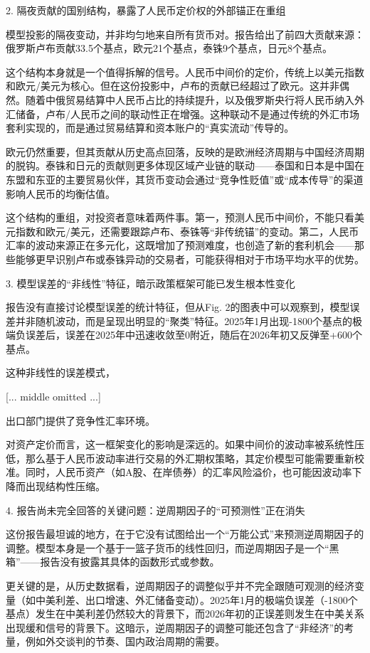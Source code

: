\documentclass[11pt]{ctexart}
\begin{document}
2. 隔夜贡献的国别结构，暴露了人民币定价权的外部锚正在重组

模型投影的隔夜变动，并非均匀地来自所有货币对。报告给出了前四大贡献来源：俄罗斯卢布贡献33.5个基点，欧元21个基点，泰铢9个基点，日元8个基点。

这个结构本身就是一个值得拆解的信号。人民币中间价的定价，传统上以美元指数和欧元/美元为核心。但在这份投影中，卢布的贡献已经超过了欧元。这并非偶然。随着中俄贸易结算中人民币占比的持续提升，以及俄罗斯央行将人民币纳入外汇储备，卢布/人民币之间的联动性正在增强。这种联动不是通过传统的外汇市场套利实现的，而是通过贸易结算和资本账户的“真实流动”传导的。

欧元仍然重要，但其贡献从历史高点回落，反映的是欧洲经济周期与中国经济周期的脱钩。泰铢和日元的贡献则更多体现区域产业链的联动——泰国和日本是中国在东盟和东亚的主要贸易伙伴，其货币变动会通过“竞争性贬值”或“成本传导”的渠道影响人民币的均衡估值。

这个结构的重组，对投资者意味着两件事。第一，预测人民币中间价，不能只看美元指数和欧元/美元，还需要跟踪卢布、泰铢等“非传统锚”的变动。第二，人民币汇率的波动来源正在多元化，这既增加了预测难度，也创造了新的套利机会——那些能够更早识别卢布或泰铢异动的交易者，可能获得相对于市场平均水平的优势。

3. 模型误差的“非线性”特征，暗示政策框架可能已发生根本性变化

报告没有直接讨论模型误差的统计特征，但从Fig. 2的图表中可以观察到，模型误差并非随机波动，而是呈现出明显的“聚类”特征。2025年1月出现-1800个基点的极端负误差后，误差在2025年中迅速收敛至0附近，随后在2026年初又反弹至+600个基点。

这种非线性的误差模式，

[... middle omitted ...]

出口部门提供了竞争性汇率环境。

对资产定价而言，这一框架变化的影响是深远的。如果中间价的波动率被系统性压低，那么基于人民币波动率进行交易的外汇期权策略，其定价模型可能需要重新校准。同时，人民币资产（如A股、在岸债券）的汇率风险溢价，也可能因波动率下降而出现结构性压缩。

4. 报告尚未完全回答的关键问题：逆周期因子的“可预测性”正在消失

这份报告最坦诚的地方，在于它没有试图给出一个“万能公式”来预测逆周期因子的调整。模型本身是一个基于一篮子货币的线性回归，而逆周期因子是一个“黑箱”——报告没有披露其具体的函数形式或参数。

更关键的是，从历史数据看，逆周期因子的调整似乎并不完全跟随可观测的经济变量（如中美利差、出口增速、外汇储备变动）。2025年1月的极端负误差（-1800个基点）发生在中美利差仍然较大的背景下，而2026年初的正误差则发生在中美关系出现缓和信号的背景下。这暗示，逆周期因子的调整可能还包含了“非经济”的考量，例如外交谈判的节奏、国内政治周期的需要。
\end{document}
